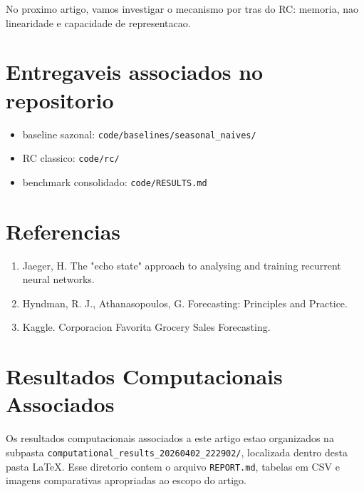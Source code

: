 \documentclass[12pt]{article}
\providecommand{\tightlist}{%
  \setlength{\itemsep}{0pt}\setlength{\parskip}{0pt}}
\begin{document}
No proximo artigo, vamos investigar o mecanismo por tras do RC: memoria, nao linearidade e capacidade de representacao.

\section{Entregaveis associados no repositorio}\label{entregaveis-associados-no-repositorio}

\begin{itemize}
\tightlist
\item
  baseline sazonal: \texttt{code/baselines/seasonal\_naives/}
\item
  RC classico: \texttt{code/rc/}
\item
  benchmark consolidado: \texttt{code/RESULTS.md}
\end{itemize}

\section{Referencias}\label{referencias}

\begin{enumerate}
\def\labelenumi{\arabic{enumi}.}
\tightlist
\item
  Jaeger, H. The "echo state" approach to analysing and training recurrent neural networks.
\item
  Hyndman, R. J., Athanasopoulos, G. Forecasting: Principles and Practice.
\item
  Kaggle. Corporacion Favorita Grocery Sales Forecasting.
\end{enumerate}

\section*{Resultados Computacionais Associados}

Os resultados computacionais associados a este artigo estao organizados na subpasta \texttt{computational\_results\_20260402\_222902/}, localizada dentro desta pasta \LaTeX. Esse diretorio contem o arquivo \texttt{REPORT.md}, tabelas em CSV e imagens comparativas apropriadas ao escopo do artigo.
\end{document}
